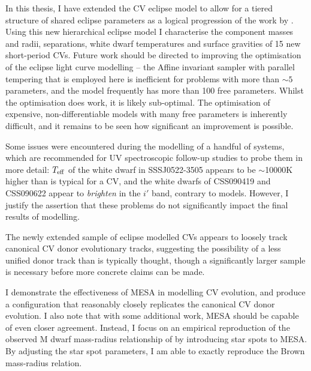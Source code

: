\label{chpt:conclusion} %

In this thesis, I have extended the CV eclipse model to allow for a tiered structure of shared eclipse parameters as a logical progression of the work by \citet{McallisterThesis}.
Using this new hierarchical eclipse model I characterise the component masses and radii, separations, white dwarf temperatures and surface gravities of 15 new short-period CVs.
Future work should be directed to improving the optimisation of the eclipse light curve modelling -- the Affine invariant sampler with parallel tempering that is employed here is inefficient for problems with more than $\sim5$ parameters, and the model frequently has more than 100 free parameters.
Whilst the optimisation does work, it is likely sub-optimal. The optimisation of expensive, non-differentiable models with many free parameters is inherently difficult, and it remains to be seen how significant an improvement is possible.

Some issues were encountered during the modelling of a handful of systems, which are recommended for UV spectroscopic follow-up studies to probe them in more detail: $T_{\rm eff}$ of the white dwarf in SSSJ0522-3505 appears to be $\sim$10000K higher than is typical for a CV, and the white dwarfs of CSS090419 and CSS090622 appear to \textit{brighten} in the $i'$ band, contrary to models.
However, I justify the assertion that these problems do not significantly impact the final results of modelling.

The newly extended sample of eclipse modelled CVs appears to loosely track canonical CV donor evolutionary tracks, suggesting the possibility of a less unified donor track than is typically thought, though a significantly larger sample is necessary before more concrete claims can be made.

I demonstrate the effectiveness of MESA in modelling CV evolution, and produce a configuration that reasonably closely replicates the canonical CV donor evolution. I also note that with some additional work, MESA should be capable of even closer agreement.
Instead, I focus on an empirical reproduction of the observed M dwarf mass-radius relationship of \citet{brown2022} by introducing star spots to MESA. By adjusting the star spot parameters, I am able to exactly reproduce the Brown mass-radius relation.

